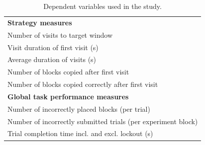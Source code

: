 \begin{table}[htp]
\centering
    \begin{tabular}{  l }
    \hline
    \textbf{ Strategy measures} \\  
    Number of visits to target window  \\ 
    Visit duration of first visit (s)  \\
    Average duration of visits (s) \\
    Number of blocks copied after first visit \\
    Number of blocks copied correctly after first visit 
    
    \vspace{10pt} \\
    
\textbf{Global task performance measures} \\ 
Number of incorrectly placed blocks (per trial) \\
Number of incorrectly submitted trials (per experiment block) \\
Trial completion time incl. and excl. lockout (s) \\ \hline
    \end{tabular}
    \caption[Study 3 dependent variables]{Dependent variables used in the study.}
    \label{table:ch4_dvs}
\end{table}

